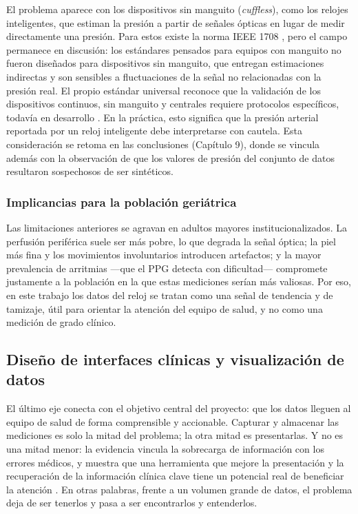 El problema aparece con los dispositivos sin manguito (\textit{cuffless}), como los relojes inteligentes, que estiman la presión a partir de señales ópticas en lugar de medir directamente una presión. Para estos existe la norma IEEE 1708 \cite{ieee1708}, pero el campo permanece en discusión: los estándares pensados para equipos con manguito no fueron diseñados para dispositivos sin manguito, que entregan estimaciones indirectas y son sensibles a fluctuaciones de la señal no relacionadas con la presión real. El propio estándar universal reconoce que la validación de los dispositivos continuos, sin manguito y centrales requiere protocolos específicos, todavía en desarrollo \cite{stergiou2018}. En la práctica, esto significa que la presión arterial reportada por un reloj inteligente debe interpretarse con cautela. Esta consideración se retoma en las conclusiones (Capítulo 9), donde se vincula además con la observación de que los valores de presión del conjunto de datos resultaron sospechosos de ser sintéticos.\\


\subsubsection{Implicancias para la población geriátrica}
Las limitaciones anteriores se agravan en adultos mayores institucionalizados. La perfusión periférica suele ser más pobre, lo que degrada la señal óptica; la piel más fina y los movimientos involuntarios introducen artefactos; y la mayor prevalencia de arritmias —que el PPG detecta con dificultad— compromete justamente a la población en la que estas mediciones serían más valiosas. Por eso, en este trabajo los datos del reloj se tratan como una señal de tendencia y de tamizaje, útil para orientar la atención del equipo de salud, y no como una medición de grado clínico.\\


\subsection{Diseño de interfaces clínicas y visualización de datos}
El último eje conecta con el objetivo central del proyecto: que los datos lleguen al equipo de salud de forma comprensible y accionable. Capturar y almacenar las mediciones es solo la mitad del problema; la otra mitad es presentarlas. Y no es una mitad menor: la evidencia vincula la sobrecarga de información con los errores médicos, y muestra que una herramienta que mejore la presentación y la recuperación de la información clínica clave tiene un potencial real de beneficiar la atención \cite{khairat2018}. En otras palabras, frente a un volumen grande de datos, el problema deja de ser tenerlos y pasa a ser encontrarlos y entenderlos.\\

